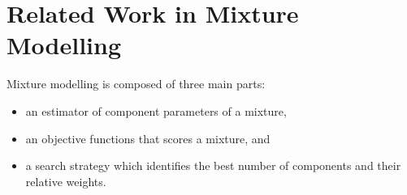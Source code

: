 \documentclass{elsarticle}
\begin{document}

\section{Related Work in Mixture Modelling}

\noindent{}Mixture modelling is composed of three main parts:
\begin{itemize}
    \item an estimator of component parameters of a mixture,
    \item an objective functions that scores a mixture, and 
    \item a search strategy which identifies the best number of components and
          their relative weights.
\end{itemize}
\end{document}

